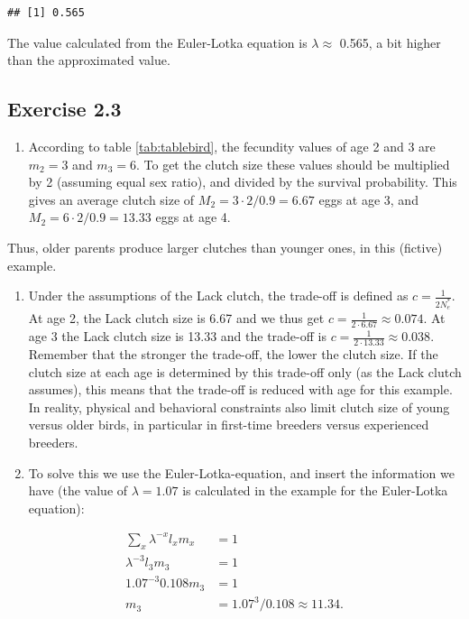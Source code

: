\documentclass[
]{book}
\providecommand{\tightlist}{%
  \setlength{\itemsep}{0pt}\setlength{\parskip}{0pt}}
\begin{document}
\begin{verbatim}
## [1] 0.565
\end{verbatim}

The value calculated from the Euler-Lotka equation is \(\lambda\approx\) 0.565, a bit higher than the approximated value.

\hypertarget{exercise-2.3-1}{%
\subsection*{Exercise 2.3}\label{exercise-2.3-1}}

\begin{enumerate}
\def\labelenumi{\arabic{enumi}.}
\tightlist
\item
  According to table \ref{tab:tablebird}, the fecundity values of age 2 and 3 are \(m_2=3\) and \(m_3=6\). To get the clutch size these values should be multiplied by 2 (assuming equal sex ratio), and divided by the survival probability. This gives an average clutch size of \(M_2=3\cdot2/0.9=6.67\) eggs at age 3, and \(M_2=6\cdot2/0.9=13.33\) eggs at age 4.
\end{enumerate}

Thus, older parents produce larger clutches than younger ones, in this (fictive) example.

\begin{enumerate}
\def\labelenumi{\arabic{enumi}.}
\setcounter{enumi}{1}
\item
  Under the assumptions of the Lack clutch, the trade-off is defined as \(c=\frac{1}{2N_e^*}\). At age 2, the Lack clutch size is 6.67 and we thus get \(c=\frac{1}{2\cdot6.67}\approx 0.074\). At age 3 the Lack clutch size is 13.33 and the trade-off is \(c=\frac{1}{2\cdot13.33}\approx 0.038\). Remember that the stronger the trade-off, the lower the clutch size. If the clutch size at each age is determined by this trade-off only (as the Lack clutch assumes), this means that the trade-off is reduced with age for this example. In reality, physical and behavioral constraints also limit clutch size of young versus older birds, in particular in first-time breeders versus experienced breeders.
\item
  To solve this we use the Euler-Lotka-equation, and insert the information we have (the value of \(\lambda=1.07\) is calculated in the example for the Euler-Lotka equation):
\end{enumerate}

\begin{align*}
\sum_x \lambda^{-x}l_xm_x&=1\\
\lambda^{-3}l_3m_3&=1\\
1.07^{-3}0.108m_3&=1\\
m_3&=1.07^{3}/0.108 \approx 11.34.
\end{align*}
\end{document}
